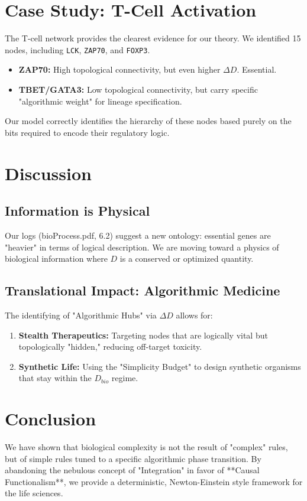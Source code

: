 \documentclass[10pt,twocolumn]{article}
\begin{document}
\section{Case Study: T-Cell Activation}
The T-cell network provides the clearest evidence for our theory. We identified 15 nodes, including \texttt{LCK}, \texttt{ZAP70}, and \texttt{FOXP3}. 
\begin{itemize}
    \item \textbf{ZAP70:} High topological connectivity, but even higher $\Delta D$. Essential.
    \item \textbf{TBET/GATA3:} Low topological connectivity, but carry specific "algorithmic weight" for lineage specification.
\end{itemize}
Our model correctly identifies the hierarchy of these nodes based purely on the bits required to encode their regulatory logic.

\section{Discussion}

\subsection{Information is Physical}
Our logs (bioProcess.pdf, 6.2) suggest a new ontology: essential genes are "heavier" in terms of logical description. We are moving toward a physics of biological information where $D$ is a conserved or optimized quantity.

\subsection{Translational Impact: Algorithmic Medicine}
The identifying of "Algorithmic Hubs" via $\Delta D$ allows for:
\begin{enumerate}
    \item \textbf{Stealth Therapeutics:} Targeting nodes that are logically vital but topologically "hidden," reducing off-target toxicity.
    \item \textbf{Synthetic Life:} Using the "Simplicity Budget" to design synthetic organisms that stay within the $D_{bio}$ regime.
\end{enumerate}

\section{Conclusion}
We have shown that biological complexity is not the result of "complex" rules, but of simple rules tuned to a specific algorithmic phase transition. By abandoning the nebulous concept of "Integration" in favor of **Causal Functionalism**, we provide a deterministic, Newton-Einstein style framework for the life sciences. 
\end{document}
